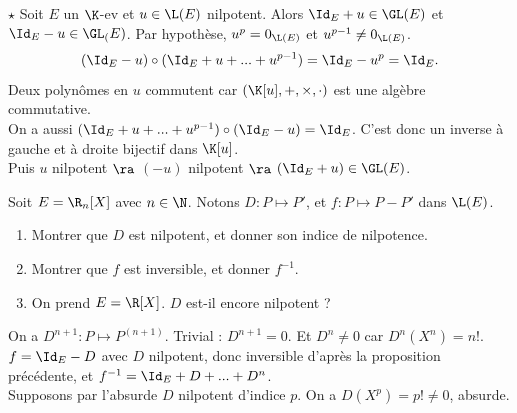 \documentclass[11pt]{article}
\begin{document}
\begin{prop}{$\star$}{}
    Soit $E$ un $\K$-ev et $u\in\L(E)$ nilpotent. Alors $\Id_E+u\in\GL(E)$ et $\Id_E-u\in\GL_(E)$.
    \tcblower
    Par hypothèse, $u^p=0_{\L(E)}$ et $u^{p-1}\neq0_{\L(E)}$.
    \begin{equation*}
        (\Id_E - u) \circ (\Id_E + u + ... + u^{p-1}) = \Id_E - u^{p} = \Id_E.
    \end{equation*}
    Deux polynômes en $u$ commutent car $(\K[u], +, \times, \cdot)$ est une algèbre commutative.\\
    On a aussi $(\Id_E+u+...+u^{p-1})\circ(\Id_E-u)=\Id_E$. C'est donc un inverse à gauche et à droite bijectif dans $\K[u]$.\\
    Puis $u$ nilpotent $\ra$ $(-u)$ nilpotent $\ra$ $(\Id_E+u)\in\GL(E)$.
\end{prop}

\begin{exercice}{}{}
    Soit $E=\R_n[X]$ avec $n\in\N$. Notons $D:P\mapsto P'$, et $f:P\mapsto P-P'$ dans $\L(E)$.
    \begin{enumerate}
        \item Montrer que $D$ est nilpotent, et donner son indice de nilpotence. 
        \item Montrer que $f$ est inversible, et donner $f^{-1}$.
        \item On prend $E=\R[X]$. $D$ est-il encore nilpotent ?
    \end{enumerate}
    \tcblower
     On a $D^{n+1} : P \mapsto P^{(n+1)}$. Trivial : $D^{n+1}=0$. Et $D^n\neq0$ car $D^n(X^n)=n!$.\\
     $f=\Id_E-D$ avec $D$ nilpotent, donc inversible d'après la proposition précédente, et $f^{-1}=\Id_E+D+...+D^{n}$.\\
     Supposons par l'absurde $D$ nilpotent d'indice $p$. On a $D(X^p)=p!\neq0$, absurde.
\end{exercice}
\end{document}
